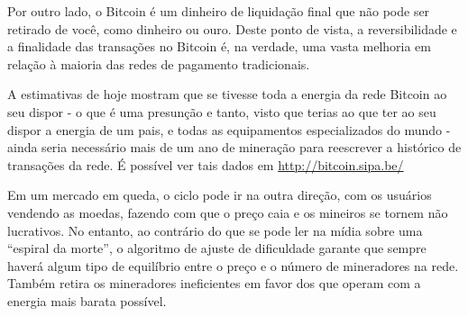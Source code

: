 Por outro lado, o Bitcoin é um dinheiro de liquidação final que não pode ser retirado de você, como dinheiro ou ouro. Deste ponto de vista, a reversibilidade e a finalidade das transações no Bitcoin é, na verdade, uma vasta melhoria em relação à maioria das redes de pagamento tradicionais.

A estimativas de hoje mostram que se tivesse toda a energia da rede Bitcoin ao seu dispor - o que é uma presunção e tanto, visto que terias ao que ter ao seu dispor a energia de um pais, e todas as equipamentos especializados do mundo - ainda seria necessário mais de um ano de mineração para reescrever a histórico de transações da rede. É possível ver tais dados em \url{http://bitcoin.sipa.be/}


Em um mercado em queda, o ciclo pode ir na outra direção, com os usuários vendendo as moedas, fazendo com que o preço caia e os mineiros se tornem não lucrativos. No entanto, ao contrário do que se pode ler na mídia sobre uma “espiral da morte”, o algoritmo de ajuste de dificuldade garante que sempre haverá algum tipo de equilíbrio entre o preço e o número de mineradores na rede. Também retira os mineradores ineficientes em favor dos que operam com a energia mais barata possível.